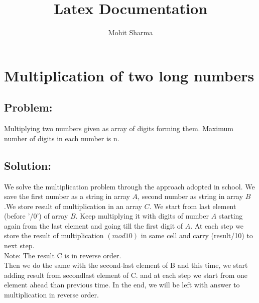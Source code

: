 \documentclass[11pt]{article}
\begin{document}
\author{Mohit Sharma}
\title{Latex Documentation}
\maketitle

\section{Multiplication of two long numbers}

\subsection{Problem:}
 Multiplying two numbers given as array of digits forming them. Maximum number of digits 
 in each number is n. \\

\subsection{ Solution: }
We solve the multiplication problem through the approach adopted in school. We save the first number as a string in array $A$, second number as string in array $B$.We store result of multiplication in an array $C$. We start from last element (before '/0') of array $B$. Keep multiplying it with digits of number $A$ starting again from the last element and going till the first digit of $A$. At each step we store the result of multiplication $(mod 10)$ in same cell and carry  (result/10) to next step.\\
{Note:} The result C is in reverse order.\\
Then we do the same with the second-last element of B and this time, we start adding result from secondlast element of C. and at each step we start from one element ahead than previous time.
In the end, we will be left with answer to multiplication in reverse order.\\\\
\end{document}
